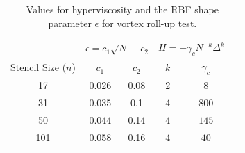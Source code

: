 \documentclass{report}
\begin{document}
\begin{table}[t]
\caption{Values for hyperviscosity and the RBF shape parameter $\epsilon$ for vortex roll-up test.}
\begin{center}
\begin{tabular}{|c|c|c|c|c|c|}
\hline		     & \multicolumn{2}{c|}{$\epsilon = c_1 \sqrt{N} - c_2$} & \multicolumn{2}{c|}{$H = -\gamma_{c} N^{-k} \Delta^{k}$ } \\ \hline
Stencil Size ($n$) & $c_{1}$ & $c_{2}$ & $k$ & $\gamma_c$ \\ \hline
17 & 0.026 & 0.08 & 2 & $8$ \\
31 & 0.035 & 0.1  & 4 & $800$ \\
50 & 0.044 & 0.14 & 4 & $145$ \\
101 & 0.058 & 0.16 & 4 & $40$ \\ \hline
\end{tabular}
\end{center}
\label{tbl:vortex_hv_params}
\end{table}
\end{document}
